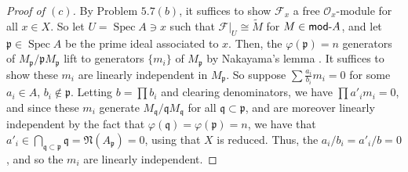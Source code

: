 \documentclass[12pt,letterpaper]{article}
\theoremstyle{definition}
\theoremstyle{remark}
\numberwithin{equation}{section}
\numberwithin{figure}{problem}
\DeclareMathOperator{\Spec}{Spec}
\newcommand{\FF}{\mathscr{F}}
\newcommand{\OO}{\mathcal{O}}
\newcommand{\Mod}{\mathsf{mod}\mathchar`-}
\begin{document}
\begin{proof}[Proof of $(c)$]
  By Problem $5.7(b)$, it suffices to show $\FF_x$ a free $\OO_x$-module for all $x \in X$. So let $U = \Spec A \ni x$ such that $\FF\vert_U \cong \tilde{M}$ for $M \in \Mod A$, and let $\mathfrak{p} \in \Spec A$ be the prime ideal associated to $x$. Then, the $\varphi(\mathfrak{p}) = n$ generators of $M_\mathfrak{p}/\mathfrak{p}M_\mathfrak{p}$ lift to generators $\{m_i\}$ of $M_\mathfrak{p}$ by Nakayama's lemma \cite[Prop.~2.8]{AM69}. It suffices to show these $m_i$ are linearly independent in $M_\mathfrak{p}$. So suppose $\sum \frac{a_i}{b_i} m_i = 0$ for some $a_i \in A$, $b_i \notin \mathfrak{p}$. Letting $b = \prod b_i$ and clearing denominators, we have $\prod a'_im_i = 0$, and since these $m_i$ generate $M_\mathfrak{q}/\mathfrak{q}M_\mathfrak{q}$ for all $\mathfrak{q} \subset \mathfrak{p}$, and are moreover linearly independent by the fact that $\varphi(\mathfrak{q}) = \varphi(\mathfrak{p}) = n$, we have that $a'_i \in \bigcap_{\mathfrak{q} \subset \mathfrak{p}} \mathfrak{q} = \mathfrak{N}(A_\mathfrak{p}) = 0$, using that $X$ is reduced. Thus, the $a_i/b_i = a'_i/b = 0$, and so the $m_i$ are linearly independent.
\end{proof}
\end{document}
